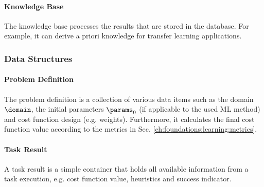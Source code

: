 \paragraph{Knowledge Base}

The knowledge base processes the results that are stored in the database.
For example, it can derive a priori knowledge for transfer learning applications.

\subsubsection{Data Structures}

\paragraph{Problem Definition}

The problem definition is a collection of various data items such as the domain $\domain$, the initial parameters $\params_0$ (if applicable to the used ML method) and cost function design (e.g. weights).
Furthermore, it calculates the final cost function value according to the metrics in Sec. \ref{ch:foundations:learning:metrics}.

\paragraph{Task Result}

A task result is a simple container that holds all available information from a task execution, e.g. cost function value, heuristics and success indicator.




